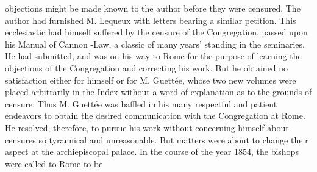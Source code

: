 objections might be made known to the author before they were censured. The author had furnished M. Lequeux with letters bearing a similar petition. This ecclesiastic had himself suffered by the censure of the Congregation, passed upon his Manual of Cannon -Law, a classic of many years' standing in the seminaries. He had submitted, and was on his way to Rome for the purpose of learning the objections of the Congregation and correcting his work. But he obtained no satisfaction either for himself or for M. Guettée, whose two new volumes were placed arbitrarily in the Index without a word of explanation as to the grounds of censure. Thus M. Guettée was baffled in his many respectful and patient endeavors to obtain the desired communication with the Congregation at Rome. He resolved, therefore, to pursue his work without concerning himself about censures so tyrannical and unreasonable. But matters were about to change their aspect at the archiepiscopal palace. In the course of the year 1854, the bishops were called to Rome to be

